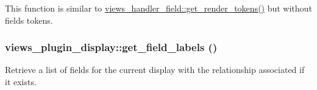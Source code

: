 This function is similar to \hyperlink{classviews__handler__field_a09c76b4e29ba8b0e6694ba4e341ef609}{views\_\-handler\_\-field::get\_\-render\_\-tokens()} but without fields tokens. \hypertarget{classviews__plugin__display_aa519531ff1725cb9211c04cc9cfc3679}{
\subsubsection[{get\_\-field\_\-labels}]{\setlength{\rightskip}{0pt plus 5cm}views\_\-plugin\_\-display::get\_\-field\_\-labels ()}}
\label{classviews__plugin__display_aa519531ff1725cb9211c04cc9cfc3679}
Retrieve a list of fields for the current display with the relationship associated if it exists.


